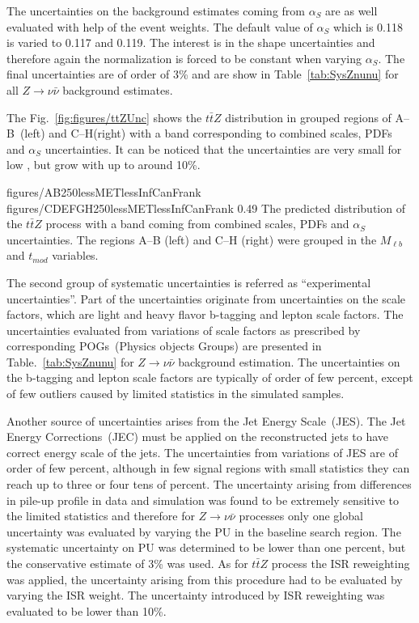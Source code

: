 The uncertainties on the background estimates coming from $\alpha_{S}$ are as well evaluated with help of the event weights. The default value of $\alpha_{S}$ which is 0.118 is varied to 0.117 and 0.119.  The interest is in the shape uncertainties and therefore again the normalization is forced to be constant when varying $\alpha_{S}$. The final uncertainties are of order of 3\% and are show in Table~\ref{tab:SysZnunu} for all $Z \to \nu \bar{\nu}$ background estimates.


The Fig.~\ref{fig:figures/ttZUnc} shows the $t\bar{t}Z$ \MET distribution in grouped regions of A--B~(left) and C--H(right) with a band corresponding to combined scales, PDFs and $\alpha_{S}$ uncertainties. It can be noticed that the uncertainties are very small for low \MET, but grow with \MET up to around 10\%.

                 {figures/AB250lessMETlessInfCanFrank} %
                 {figures/CDEFGH250lessMETlessInfCanFrank} %
                 {0.49}       %
                 { The predicted \MET distribution of the $t\bar{t}Z$ process with a band coming from combined scales, PDFs and $\alpha_{S}$ uncertainties. The regions A--B (left) and C--H (right) were grouped in the $M_{\ell b}$ and $t_{mod}$ variables. }


The second group of systematic uncertainties is referred as ``experimental uncertainties''. Part of the uncertainties originate from uncertainties on the scale factors, which are light and heavy flavor b-tagging and lepton scale factors. The uncertainties evaluated from variations of scale factors as prescribed by corresponding POGs~(Physics objects Groups) are presented in Table.~\ref{tab:SysZnunu} for $Z \to \nu \bar{\nu}$ background estimation. The uncertainties on the b-tagging and lepton scale factors are typically of order of few percent, except of few outliers caused by limited statistics in the simulated samples.

Another source of uncertainties arises from the Jet Energy Scale~(JES). The Jet Energy Corrections~(JEC) must be applied on the reconstructed jets to have correct energy scale of the jets. The uncertainties from variations of JES are of order of few percent, although in few signal regions with small statistics they can reach up to three or four tens of percent. The uncertainty arising from differences in pile-up profile in data and simulation was found to be extremely sensitive to the limited statistics and therefore for $Z \to  \nu \bar{\nu}$ processes only one global uncertainty was evaluated by varying the PU in the baseline search region. The systematic uncertainty on PU was determined to be lower than one percent, but the conservative estimate of 3\% was used. As for $t\bar{t}Z$ process the ISR reweighting was applied, the uncertainty arising from this procedure had to be evaluated by varying the ISR weight. The uncertainty introduced by ISR reweighting was evaluated to be lower than 10\%.

